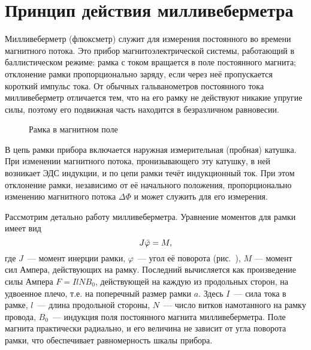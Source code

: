 \newpage

\labsupplement

\section*{Принцип действия милливеберметра}\label{MWB}

\setcounter{figure}{0}

{\small 

Милливеберметр (флюксметр) служит для измерения постоянного во времени
магнитного потока. Это прибор магнитоэлектрической системы, 
работающий в баллистическом режиме: рамка с током вращается в поле 
постоянного магнита; отклонение рамки пропорционально заряду,
если через неё пропускается короткий импульс тока. 
От обычных гальванометров постоянного тока милливеберметр 
отличается тем, что на его рамку не действуют никакие упругие силы, 
поэтому его подвижная часть находится в безразличном равновесии.

\begin{figure}[h!]
    \caption{Рамка в магнитном поле}
\end{figure}

В цепь рамки прибора включается наружная измерительная (пробная) катушка. 
При изменении магнитного потока, пронизывающего эту катушку, 
в ней возникает ЭДС индукции, и по цепи рамки течёт индукционный ток. 
При этом отклонение рамки, независимо от её начального
положения, пропорционально изменению магнитного потока $\Delta\Phi$ 
и может служить для его измерения.

Рассмотрим детально работу милливеберметра. 
Уравнение моментов для рамки имеет вид
\begin{equation}
    J\ddot{\varphi}=M,
    \eqmark{MWB.1}
\end{equation}
где $J$~--- момент инерции рамки, 
$\varphi$~--- угол её поворота (рис.~),
$M$ --- момент сил Ампера, действующих на рамку.
Последний вычисляется как произведение силы Ампера $F=IlNB_0$, 
действующей на каждую из продольных сторон,
на удвоенное плечо, т.е. на поперечный размер
рамки $a$. Здесь $I$~--- сила тока в рамке, $l$~--- длина продольной
стороны, $N$~--- число витков намотанного на рамку провода, 
$B_0$~--- индукция поля постоянного магнита милливеберметра. 
Поле магнита практически радиально, и его величина не зависит от угла поворота
рамки, что обеспечивает равномерность шкалы прибора. 

}

